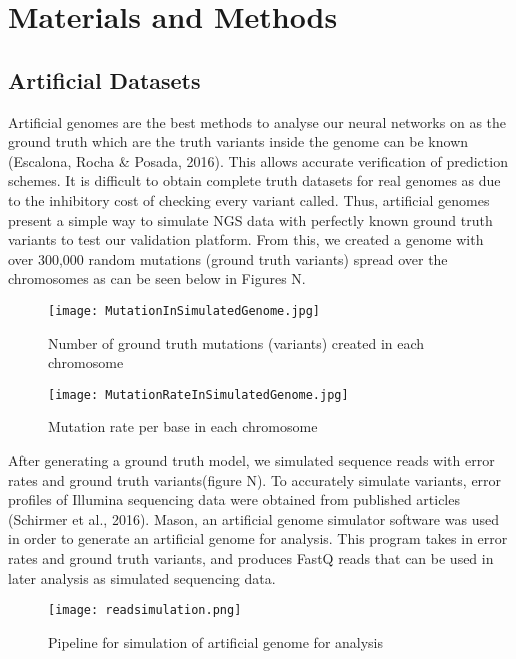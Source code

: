 \documentclass{article}
\begin{document}
\section{Materials and Methods}

\subsection{Artificial Datasets}


 Artificial genomes are the best methods to analyse our neural networks on as the ground truth which are the truth variants inside the genome can be known (Escalona, Rocha \& Posada, 2016). This allows accurate verification of prediction schemes. It is difficult to obtain complete truth datasets for real genomes as due to the inhibitory cost of checking every variant called. Thus, artificial genomes present a simple way to simulate NGS data with perfectly known ground truth variants to test our validation platform. From this, we created a genome with over 300,000 random mutations (ground truth variants) spread over the chromosomes as can be seen below in Figures N. 

\begin{figure}[H]
\texttt{[image: MutationInSimulatedGenome.jpg]}
\caption{Number of ground truth mutations (variants) created in each chromosome }
\centering
\end{figure}

\begin{figure}[H]
\texttt{[image: MutationRateInSimulatedGenome.jpg]}
\caption{Mutation rate per base in each chromosome}
\centering
\end{figure}

After generating a ground truth model, we simulated sequence reads with error rates and ground truth variants(figure N). To accurately simulate variants, error profiles of Illumina sequencing data were obtained from published articles (Schirmer et al., 2016). Mason, an artificial genome simulator software was used in order to generate an artificial genome for analysis. This program takes in error rates and ground truth variants, and produces FastQ reads that can be used in later analysis as simulated sequencing data.

\begin{figure}[H]
\texttt{[image: readsimulation.png]}
\caption{Pipeline for simulation of artificial genome for analysis}
\centering
\end{figure}
\end{document}
